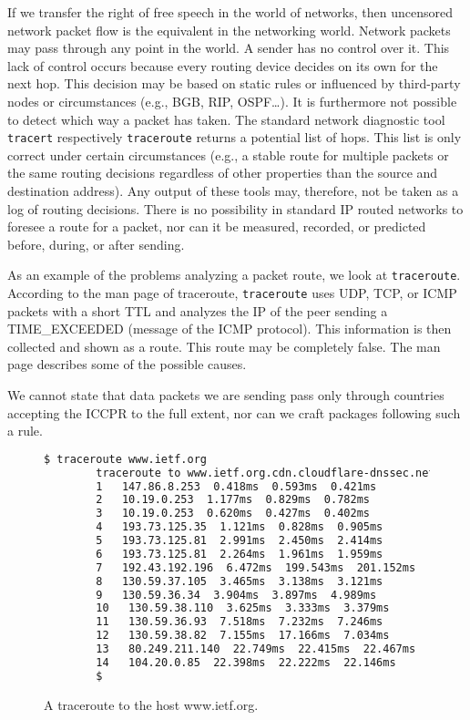If we transfer the right of free speech in the world of networks, then uncensored network packet flow is the equivalent in the networking world. Network packets may pass through any point in the world. A sender has no control over it. This lack of control occurs because every routing device decides on its own for the next hop. This decision may be based on static rules or influenced by third-party nodes or circumstances (e.g., BGB, RIP, OSPF\ldots). It is furthermore not possible to detect which way a packet has taken. The standard network diagnostic tool \verb|tracert| respectively \verb|traceroute| returns a potential list of hops. This list is only correct under certain circumstances (e.g., a stable route for multiple packets or the same routing decisions regardless of other properties than the source and destination address). Any output of these tools may, therefore, not be taken as a log of routing decisions. There is no possibility in standard IP routed networks to foresee a route for a packet, nor can it be measured, recorded, or predicted before, during, or after sending. 

As an example of the problems analyzing a packet route, we look at \verb|traceroute|. According to the man page of traceroute, \verb|traceroute| uses UDP, TCP, or ICMP packets with a short TTL and analyzes the IP of the peer sending a TIME\_EXCEEDED (message of the ICMP protocol). This information is then collected and shown as a route. This route may be completely false. The man page describes some of the possible causes.

We cannot state that data packets we are sending pass only through countries accepting the ICCPR to the full extent, nor can we craft packages following such a rule.

\begin{figure}[H]
	\begin{lstlisting}[language=bash,breaklines=true,basicstyle=\tiny]
		$ traceroute www.ietf.org
		traceroute to www.ietf.org.cdn.cloudflare-dnssec.net (104.20.0.85), 64 hops max
		1   147.86.8.253  0.418ms  0.593ms  0.421ms
		2   10.19.0.253  1.177ms  0.829ms  0.782ms
		3   10.19.0.253  0.620ms  0.427ms  0.402ms
		4   193.73.125.35  1.121ms  0.828ms  0.905ms
		5   193.73.125.81  2.991ms  2.450ms  2.414ms
		6   193.73.125.81  2.264ms  1.961ms  1.959ms
		7   192.43.192.196  6.472ms  199.543ms  201.152ms
		8   130.59.37.105  3.465ms  3.138ms  3.121ms
		9   130.59.36.34  3.904ms  3.897ms  4.989ms
		10   130.59.38.110  3.625ms  3.333ms  3.379ms
		11   130.59.36.93  7.518ms  7.232ms  7.246ms
		12   130.59.38.82  7.155ms  17.166ms  7.034ms
		13   80.249.211.140  22.749ms  22.415ms  22.467ms
		14   104.20.0.85  22.398ms  22.222ms  22.146ms
		$
	\end{lstlisting}
	\caption{A traceroute to the host www.ietf.org.}
\end{figure}

